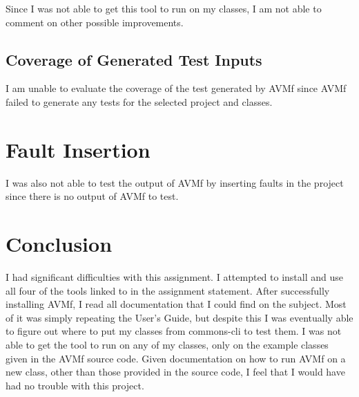 \documentclass[letterpaper,10pt]{article}
\begin{document}
		Since I was not able to get this tool to run on my classes, I am not able to 
		comment on other possible improvements.
	\subsection{Coverage of Generated Test Inputs}
	I am unable to evaluate the coverage of the test generated by AVMf since AVMf failed to 
	generate any tests for the selected project and classes.
\section{Fault Insertion}
I was also not able to test the output of AVMf by inserting faults in the project since there is 
no output of AVMf to test.

\section{Conclusion}
I had significant difficulties with this assignment. I attempted to install and use all four of 
the tools linked to in the assignment statement. After successfully installing AVMf, I read all 
documentation that I could find on the subject. Most of it was simply repeating the User's Guide, 
but despite this I was eventually able to figure out where to put my classes from commons-cli to 
test them. I was not able to get the tool to run on any of my classes, only on the example 
classes given in the AVMf source code. Given documentation on how to run AVMf on a new class, 
other than those provided in the source code, I feel that I would have had no trouble with this 
project.
\end{document}
